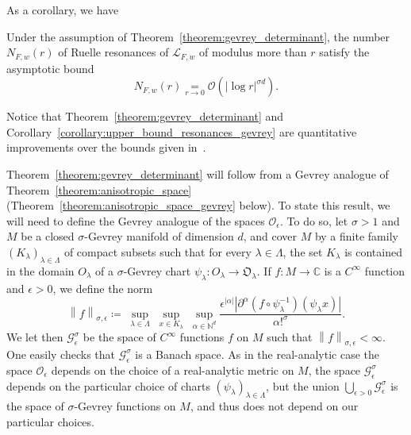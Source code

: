 \documentclass[AHL,Unicode,longabstracts,published]{cedram}
\newcommand{\p}[1]{\left(#1\right)}
\newcommand{\n}[1]{\left\|#1\right\|}
\newcommand{\va}[1]{\left|#1\right|}
\newcommand{\clO}{\mathcal{O}}
\newcommand{\clL}{\mathcal{L}}
\newcommand{\clG}{\mathcal{G}}
\newcommand{\fkO}{\mathfrak{O}}
\newcommand{\bbC}{\mathbb{C}}
\newcommand{\bbN}{\mathbb{N}}
\newcommand{\clO}{\mathcal{O}}
\begin{document}
As a corollary, we have

\begin{coro}\label{corollary:upper_bound_resonances_gevrey}
Under the assumption of Theorem~\ref{theorem:gevrey_determinant}, the number $N_{F,w}(r)$ of Ruelle resonances of $\clL_{F,w}$ of modulus more than $r$ satisfy the asymptotic bound
\begin{equation*}
N_{F,w}(r) \underset{r \to 0}{=} \clO\p{\va{\log r}^{\sigma d}}.
\end{equation*}
\end{coro}

\begin{rema}
Notice that Theorem~\ref{theorem:gevrey_determinant} and Corollary~\ref{corollary:upper_bound_resonances_gevrey} are quantitative improvements over the bounds given in~\cite[Theorem~2.12]{local_and_global}.
\end{rema}

Theorem~\ref{theorem:gevrey_determinant} will follow from a Gevrey analogue of Theorem~\ref{theorem:anisotropic_space} (Theorem~\ref{theorem:anisotropic_space_gevrey} below). To state this result, we will need to define the Gevrey analogue of the spaces $\clO_\epsilon$. To do so, let $\sigma > 1$ and $M$ be a closed $\sigma$-Gevrey manifold of dimension $d$, and cover $M$ by a finite family $(K_\lambda)_{\lambda \in \Lambda}$ of compact subsets such that for every $\lambda \in \Lambda$, the set $K_\lambda$ is contained in the domain $O_\lambda$ of a $\sigma$-Gevrey chart $\psi_\lambda : O_\lambda \to \fkO_\lambda$. If $f : M \to \bbC$ is a $C^\infty$ function and $\epsilon > 0$, we define the norm
\begin{equation*}
\n{f}_{\sigma,\epsilon} \coloneqq\; \sup_{\lambda  \in \Lambda}\; \sup_{x \in K_\lambda}\; \sup_{\alpha \in \bbN^d} \frac{\epsilon^{\va{\alpha}}\va{\partial^\alpha \left(f \circ \psi_\lambda^{-1}\right)(\psi_\lambda x)}}{\alpha!^\sigma}.
\end{equation*}
We let then $\clG^\sigma_\epsilon$ be the space of $C^\infty$ functions $f$ on $M$ such that $\n{f}_{\sigma,\epsilon} < \infty$. One easily checks that $\clG^\sigma_\epsilon$ is a Banach space. As in the real-analytic case the space $\clO_\epsilon$ depends on the choice of a real-analytic metric on $M$, the space $\clG^\sigma_\epsilon$ depends on the particular choice of charts $(\psi_\lambda)_{\lambda \in \Lambda}$, but the union $\bigcup_{\epsilon > 0} \clG^\sigma_\epsilon$ is the space of $\sigma$-Gevrey functions on $M$, and thus does not depend on our particular choices.
\end{document}
